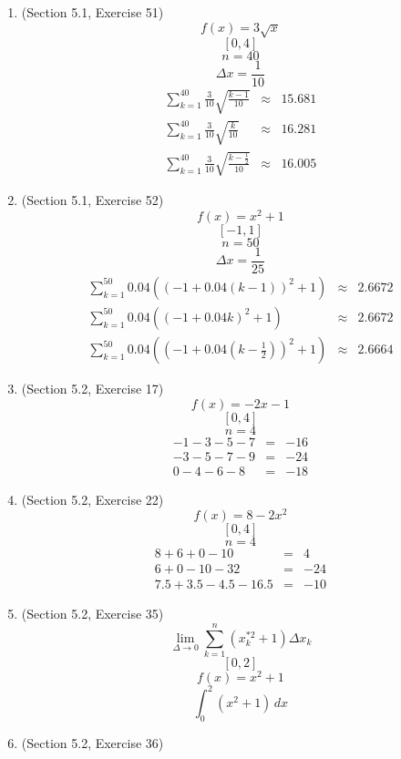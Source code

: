 \documentclass{article}
\begin{document}
\begin{enumerate}
    \item (Section 5.1, Exercise 51)
        $$f(x) = 3\sqrt{x}$$
        $$[0,4]$$
        $$n = 40$$
        $$\Delta{x} = \frac{1}{10}$$
        \begin{eqnarray}
            \sum_{k = 1}^{40}{\frac{3}{10}\sqrt{\frac{k - 1}{10}}} &\approx& 15.681 \\
            \sum_{k = 1}^{40}{\frac{3}{10}\sqrt{\frac{k}{10}}} &\approx& 16.281 \\
            \sum_{k = 1}^{40}{\frac{3}{10}\sqrt{\frac{k - \frac{1}{2}}{10}}} &\approx& 16.005
        \end{eqnarray}
    \item (Section 5.1, Exercise 52)
        $$f(x) = x^2 + 1$$
        $$[-1,1]$$
        $$n = 50$$
        $$\Delta{x} = \frac{1}{25}$$
        \begin{eqnarray}
            \sum_{k = 1}^{50}{0.04\left(\left(-1 + 0.04\left(k - 1\right)\right)^2 + 1\right)} &\approx& 2.6672 \\
            \sum_{k = 1}^{50}{0.04\left(\left(-1 + 0.04k\right)^2 + 1\right)} &\approx& 2.6672 \\
            \sum_{k = 1}^{50}{0.04\left(\left(-1 + 0.04\left(k - \frac{1}{2}\right)\right)^2 + 1\right)} &\approx& 2.6664
        \end{eqnarray}
    \item (Section 5.2, Exercise 17)
        $$f(x) = -2x - 1$$
        $$[0,4]$$
        $$n = 4$$
        \begin{eqnarray}
            -1 - 3 - 5 - 7 &=& -16 \\
            - 3 - 5 - 7 - 9 &=& -24 \\
            0 - 4 - 6 - 8 &=& -18
        \end{eqnarray}
    \item (Section 5.2, Exercise 22)
        $$f(x) = 8 - 2x^2$$
        $$[0,4]$$
        $$n = 4$$
        \begin{eqnarray}
            8 + 6 + 0 - 10 &=& 4 \\
            6 + 0 - 10 - 32 &=& -24 \\
            7.5 + 3.5 - 4.5 - 16.5 &=& -10
        \end{eqnarray}
    \item (Section 5.2, Exercise 35)
        $$\lim_{\Delta \to 0}{\sum_{k = 1}^n{\left(x_k^{*2} + 1\right)\Delta{x_k}}}$$
        $$[0,2]$$
        $$f(x) = x^2 + 1$$
        $$\int_0^2{\left(x^2 + 1\right)\,dx}$$
    \item (Section 5.2, Exercise 36)

\end{enumerate}
\end{document}
